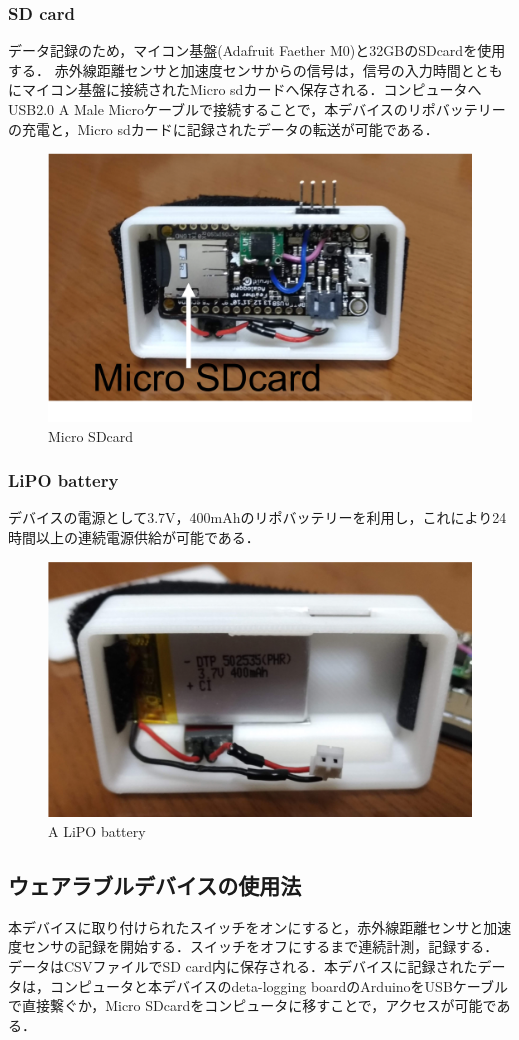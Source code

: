 \subsubsection*{SD card}
データ記録のため，マイコン基盤(Adafruit Faether M0)と32GBのSDcardを使用する．
赤外線距離センサと加速度センサからの信号は，信号の入力時間とともにマイコン基盤に接続されたMicro sdカードへ保存される．コンピュータへUSB2.0 A Male Microケーブルで接続することで，本デバイスのリポバッテリーの充電と，Micro sdカードに記録されたデータの転送が可能である．


\begin{figure}[H]
  \centering
  \includegraphics[width=0.5\linewidth]{fig/sdcard}
  \caption{Micro SDcard}
  \label{fig:sd card}
\end{figure}


\subsubsection*{LiPO battery}
デバイスの電源として3.7V，400mAhのリポバッテリーを利用し，これにより24時間以上の連続電源供給が可能である．
\begin{figure}[H]
  \centering
  \includegraphics[width=0.5\linewidth]{fig/battery}
  \caption{A LiPO battery}
  \label{fig:battery}
\end{figure}



\subsection*{ウェアラブルデバイスの使用法}
本デバイスに取り付けられたスイッチをオンにすると，赤外線距離センサと加速度センサの記録を開始する．スイッチをオフにするまで連続計測，記録する．データはCSVファイルでSD card内に保存される．本デバイスに記録されたデータは，コンピュータと本デバイスのdeta-logging boardのArduinoをUSBケーブルで直接繋ぐか，Micro SDcardをコンピュータに移すことで，アクセスが可能である．

